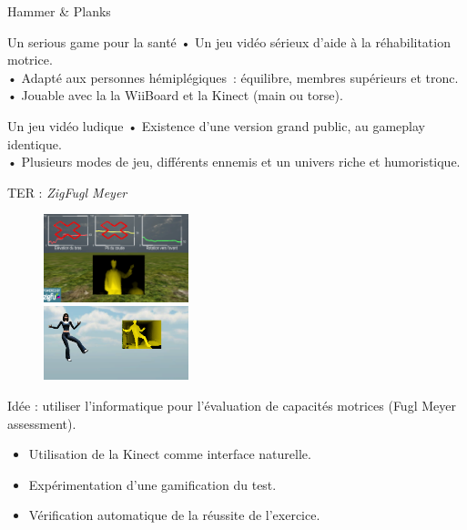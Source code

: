 \documentclass{beamer}
\begin{document}
		\begin{frame}{Hammer \& Planks}
			\begin{alertblock}{Un serious game pour la santé}
				• Un jeu vidéo sérieux d'aide à la réhabilitation motrice.\\
				• Adapté aux personnes hémiplégiques~: équilibre, membres supérieurs et tronc.\\
				• Jouable avec la la WiiBoard et la Kinect (main ou torse).
			\end{alertblock}
			\begin{exampleblock}{Un jeu vidéo ludique}
				• Existence d'une version grand public, au gameplay identique.\\
				• Plusieurs modes de jeu, différents ennemis et un univers riche et humoristique.
			\end{exampleblock}	
		\end{frame}
		
		\begin{frame}{TER : \emph{ZigFugl Meyer}}
			\begin{minipage}{0.40\linewidth}
				\begin{figure}
					\includegraphics[width=4.2cm]{../images/zigfugl-meyer_1.png}\\
					\includegraphics[width=4.2cm]{../images/zigfugl-meyer_2.png}
				\end{figure}
			\end{minipage}
			\begin{minipage}{6cm}%
				Idée : utiliser l'informatique pour l'évaluation de capacités motrices (Fugl Meyer assessment). 
					\begin{itemize}
						\item Utilisation de la Kinect comme interface naturelle.
						\item Expérimentation d'une gamification du test.
						\item Vérification automatique de la réussite de l'exercice.
					\end{itemize}
			\end{minipage}
		\end{frame}
	
\end{document}
